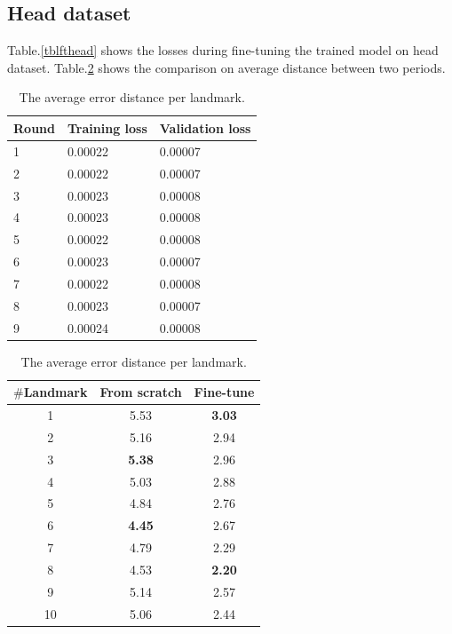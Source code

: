 \documentclass[12pt,a4paper]{article}
\begin{document}
\subsection{Head dataset}
Table.\ref{tblfthead} shows the losses during fine-tuning the trained model on head dataset. Table.\ref{tblcmphead} shows the comparison on average distance between two periods.

\begin{table}[ht]
\begin{minipage}[b]{0.5\textwidth}
	\centering
	\begin{tabular}{l l l}
	Round & Training loss & Validation loss \\ \hline
	1 & 0.00022 & 0.00007  \\ \hline
	2 & 0.00022 & 0.00007 \\ \hline
	3 & 0.00023 & 0.00008 \\ \hline
	4 & 0.00023 & 0.00008 \\ \hline
	5 & 0.00022 & 0.00008 \\ \hline
	6 & 0.00023 & 0.00007 \\ \hline
	7 & 0.00022 & 0.00008 \\ \hline
	8 & 0.00023 & 0.00007 \\ \hline
	9 & 0.00024 & 0.00008 \\ \hline
	\end{tabular}
	\caption{The losses during fine-tuning model on head dataset}
	\label{tblfthead}
\end{minipage}
\hfill
\begin{minipage}[b]{0.5\textwidth}
\centering
\begin{tabular}{|c|c|c|}
\hline
\textbf{$\#$Landmark} & \textbf{From scratch} & \textbf{Fine-tune} \\ \hline
1 & 5.53 & \textbf{3.03}  \\ \hline
2 & 5.16 & 2.94  \\ \hline
3 & \textbf{5.38}  & 2.96 \\ \hline
4 & 5.03  & 2.88 \\ \hline
5 & 4.84  & 2.76 \\ \hline
6 & \textbf{4.45}  & 2.67 \\ \hline
7 & 4.79  & 2.29 \\ \hline
8 & 4.53  & \textbf{2.20} \\ \hline
9 & 5.14  & 2.57 \\ \hline
10 & 5.06  & 2.44 \\ \hline
\end{tabular}
\caption{The average error distance per landmark.}
\label{tblcmphead}
\end{minipage}
\end{table}
\end{document}
